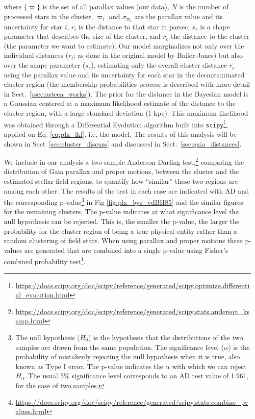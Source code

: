 \documentclass[draft]{aa}
\begin{document}
\noindent where $\{\varpi\}$ is the set of all parallax values (our
data), $N$ is the number of processed stars in the cluster,
$\varpi_{i}$ and $\sigma_{\varpi_{i}}$ are the parallax value and its
uncertainty for star $i$, $r_{i}$ is the distance to that star in parsec,
$s_{c}$ is a shape parameter that describes the size of the cluster, and
$r_{c}$ the distance to the cluster (the parameter we want to estimate).
%
Our model marginalizes not only over the individual distances ($r_i$;
as done in the original model by Bailer-Jones) but also
over the shape parameter ($s_c$), estimating only the overall cluster distance
$r_c$ using the parallax value and its uncertainty for each star in the
decontaminated cluster region (the membership probabilities process is
described with more detail in Sect.~\ref{ssec:asteca_works}).
%
The prior for the distance in the Bayesian model is a Gaussian centered at a
maximum likelihood estimate of the distance to the cluster region, with a large
standard deviation (1 kpc). This maximum likelihood was
obtained through a Differential Evolution algorithm built into
\texttt{scipy}\footnote{\url{https://docs.scipy.org/doc/scipy/reference/generated/scipy.optimize.differential_evolution.html}},
applied on Eq. \ref{eq:plx_lkl}, i.e, the model.
%
The results of this analysis will be shown in Sect~\ref{sec:cluster_discuss}
and discussed in Sect.~\ref{sec:gaia_distances}.

We include in our analysis a two-sample Anderson-Darling
test,\footnote{\url{https://docs.scipy.org/doc/scipy/reference/generated/scipy.stats.anderson_ksamp.html}}
comparing the distribution of Gaia parallax and proper motions,
between the cluster and the estimated stellar field regions, to quantify how
``similar'' these two regions are among each other.
The results of the test in each case are indicated with AD and the
corresponding p-value\footnote{The null hypothesis ($H_{0}$) is the
hypothesis that the distributions of the two samples are drawn from the same
population. The significance level ($\alpha$) is the probability of mistakenly
rejecting the null hypothesis when it is true, also known as Type I error. The
p-value indicates the $\alpha$ with which we can reject $H_{0}$. The usual 5\%
significance level corresponds to an AD test value of 1.961, for the case of two
samples.} in Fig \ref{fig:plx_bys_vdBH85} and the similar figures for
the remaining clusters.
The p-value indicates at what significance level the null hypothesis
can be rejected. This is, the smaller the p-value, the larger the probability
for the cluster region of being a true physical entity rather than a random
clustering of field stars. When using parallax and proper motions three
p-values are generated that are combined into a single p-value using Fisher's
combined probability
test\footnote{\url{https://docs.scipy.org/doc/scipy/reference/generated/scipy.stats.combine_pvalues.html}}.
\end{document}
